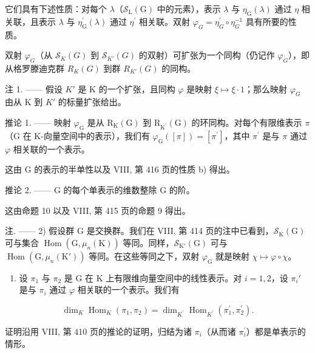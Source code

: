 它们具有下述性质：对每个 \(\lambda\)（\(\mathcal{S}_{\mathrm{L}}(\mathrm{G})\) 中的元素），表示 \(\lambda\) 与 \(\eta_{\mathrm{G}}(\lambda)\) 通过 \(\eta\) 相关联，且表示 \(\lambda\) 与 \(\eta_{\mathrm{G}}^{\prime}(\lambda)\) 通过 \(\eta^{\prime}\) 相关联。双射 \(\varphi_{G} = \eta_{G}^{\prime} \circ \eta_{G}^{-1}\) 具有所要的性质。

双射 \(\varphi_{G}\)（从 \(\mathcal{S}_{K}(G)\) 到 \(\mathcal{S}_{K'}(G)\) 的双射）可扩张为一个同构（仍记作 \(\varphi_{G}\)），即从格罗滕迪克群 \(R_{K}(G)\) 到群 \(R_{K'}(G)\) 的同构。

注 1. —— 假设 \(K'\) 是 K 的一个扩张，且同构 \(\varphi\) 是映射 \(\xi \mapsto \xi \cdot 1\)；那么映射 \(\varphi_{G}\) 由从 K 到 \(K'\) 的标量扩张给出。

推论 1. —— 映射 \(\varphi_{\mathrm{G}}\) 是从 \(\mathrm{R}_{\mathrm{K}}(\mathrm{G})\) 到 \(\mathrm{R}_{\mathrm{K}^{\prime}}(\mathrm{G})\) 的环同构。对每个有限维表示 \(\pi\)（\(\mathrm{G}\) 在 K-向量空间中的表示），我们有 \(\varphi_{\mathrm{G}}([\pi]) = [\pi^{\prime}]\)，其中 \(\pi^{\prime}\) 是与 \(\pi\) 通过 \(\varphi\) 相关联的一个表示。

这由 G 的表示的半单性以及 VIII, 第 416 页的性质 b) 得出。

推论 2. —— G 的每个单表示的维数整除 G 的阶。

这由命题 10 以及 VIII, 第 415 页的命题 9 得出。

注. —— 2) 假设群 G 是交换群。我们在 VIII, 第 414 页的注中已看到，\(\mathcal{S}_{\mathrm{K}}(\mathrm{G})\) 可与集合 \(\operatorname{Hom}(\mathrm{G}, \mu_n(\mathrm{K}))\) 等同。同样，\(\mathcal{S}_{\mathrm{K}'}(\mathrm{G})\) 可与 \(\operatorname{Hom}(\mathrm{G}, \mu_n(\mathrm{K}'))\) 等同。在这些等同之下，双射 \(\varphi_{\mathrm{G}}\) 就是映射 \(\chi \mapsto \varphi \circ \chi\)。

\begin{enumerate}
\def\labelenumi{\arabic{enumi})}
\setcounter{enumi}{2}
\tightlist
\item
  设 \(\pi_1\) 与 \(\pi_2\) 是 G 在 K 上有限维向量空间中的线性表示。对 \(i = 1,2\)，设 \(\pi_i'\) 是与 \(\pi_i\) 通过 \(\varphi\) 相关联的一个表示。我们有
\end{enumerate}

\[
\dim_ {K} \operatorname{Hom} _ {K} (\pi_ {1}, \pi_ {2}) = \dim_ {K ^ {\prime}} \operatorname{Hom} _ {K ^ {\prime}} (\pi_ {1} ^ {\prime}, \pi_ {2} ^ {\prime}).\tag{47}
\]

证明沿用 VIII, 第 410 页的推论的证明，归结为诸 \(\pi_{i}\)（从而诸 \(\pi_{i}^{\prime}\)）都是单表示的情形。

